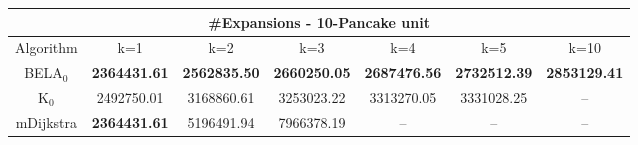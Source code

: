 \begin{tabular}{c|cccccc}\toprule
\multicolumn{7}{c}{#Expansions - 10-Pancake unit}\\ \midrule
Algorithm & k=1 & k=2 & k=3 & k=4 & k=5 & k=10 \\ \midrule
BELA$_0$ & \textbf{2364431.61} & \textbf{2562835.50} & \textbf{2660250.05} & \textbf{2687476.56} & \textbf{2732512.39} & \textbf{2853129.41} \\
K$_0$ & 2492750.01 & 3168860.61 & 3253023.22 & 3313270.05 & 3331028.25 & -- \\
mDijkstra & \textbf{2364431.61} & 5196491.94 & 7966378.19 & -- & -- & -- \\ \bottomrule 
\end{tabular}
